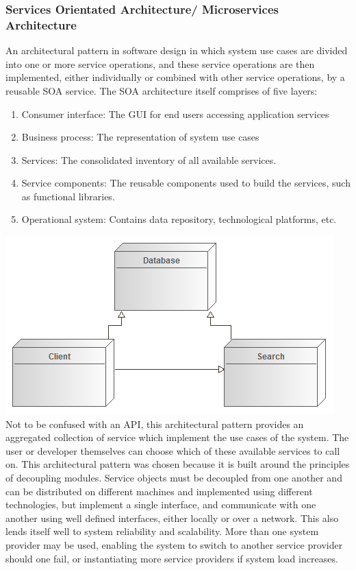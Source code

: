 \documentclass[a4paper,10pt]{article}
\begin{document}
	\subsubsection{Services Orientated Architecture/ Microservices Architecture}
An architectural pattern in software design in which system use cases are divided into one or more service operations, and these service operations are then implemented, either individually or combined with other service operations, by a reusable SOA service. The SOA architecture itself comprises of five layers:
	\begin{enumerate}
		\item Consumer interface: The GUI for end users accessing application services
		\item Business process: The representation of system use cases
		\item Services: The consolidated inventory of all available services.
		\item Service components: The reusable components used to build the services, such as functional libraries.
		\item Operational system: Contains data repository, technological platforms, etc.
	\end{enumerate}
 	\includegraphics[scale=0.5]{service_oriented_architecture_diagram.png}\\

Not to be confused with an API, this architectural pattern provides an aggregated collection of service which implement the use cases of the system. The user or developer themselves can choose which of these available services to call on. This architectural pattern was chosen because it is built around the principles of decoupling modules. Service objects must be decoupled from one another and can be distributed on different machines and implemented using different technologies, but implement a single interface, and communicate with one another using well defined interfaces, either locally or over a network. This also lends itself well to system reliability and scalability. More than one system provider may be used, enabling the system to switch to another service provider should one fail, or instantiating more service providers if system load increases.
\end{document}
